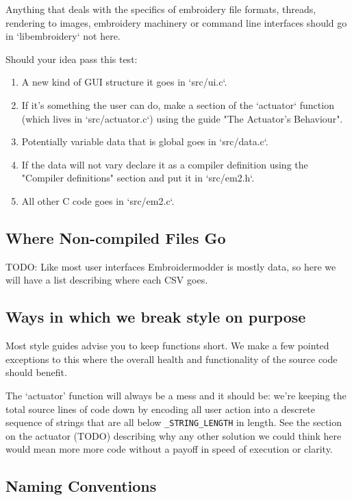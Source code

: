 \documentclass{report}
\begin{document}
Anything that deals with the specifics of embroidery file formats, threads, rendering to images, embroidery machinery or command line interfaces should go in `libembroidery` not here.

Should your idea pass this test:

\begin{enumerate}
\item A new kind of GUI structure it goes in `src/ui.c`.
\item If it's something the user can do, make a section of the `actuator` function (which lives in `src/actuator.c`) using the guide "The Actuator's Behaviour".
\item Potentially variable data that is global goes in `src/data.c`.
\item If the data will not vary declare it as a compiler definition using the "Compiler definitions" section and put it in `src/em2.h`.
\item All other C code goes in `src/em2.c`.
\end{enumerate}

\subsection{Where Non-compiled Files Go}

TODO: Like most user interfaces Embroidermodder is mostly data, so here we will have a list describing where each CSV goes.

\subsection{Ways in which we break style on purpose}

Most style guides advise you to keep functions short. We make a few pointed exceptions to this where the overall health and functionality of the source code should benefit.

The `actuator' function will always be a mess and it should be: we're keeping the total source lines of code down by encoding all user action into a descrete sequence of strings that are all below \texttt{\_STRING\_LENGTH} in length. See the section on the actuator (TODO) describing why any other solution we could think  here would mean more more code without a payoff in speed of execution or clarity.

\subsection{Naming Conventions}
\end{document}
